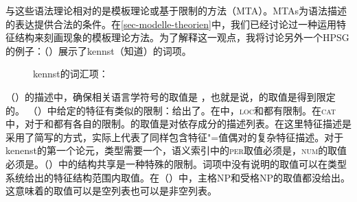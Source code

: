 与这些语法理论相对的是模板理论或基于限制的方法（MTA）。MTAs为语法描述的表达提供合法的条件。在\ref{sec-modelle-theorien}中，我们已经讨论过一种运用特征结构来刻画现象的模板理论方法。为了解释这一观点，我将讨论另外一个HPSG的例子：（）展示了kennst（知道）的词项。
\begin{figure}
\eas
kennst的词汇项：\\
\label{le-kennst-mts}%
\zs
\vspace{-\baselineskip}
\end{figure}
（）的描述中，确保相关语言学符号的\phonvc 取值是 ，也就是说，\phonc 的取值是得到限定的。 （）中给定的特征有类似的限制：给出了\synsemvc。在\synsemc 中，\textsc{loc}和\nonlocvc 都有限制。在\textsc{cat}中，对于\headc 和\subcatc 都有各自的限制。\subcatc 的取值是对依存成分的描述列表。在这里特征描述是采用了简写的方式，实际上代表了同样包含特征"=值偶对的复杂特征描述。对于kenenst的第一个论元，类型需要一个\headvc，语义索引中的\textsc{per}取值必须是，\textsc{num}的取值必须是。（）中的结构共享是一种特殊的限制。词项中没有说明的取值可以在类型系统给出的特征结构范围内取值。在（）中，主格NP和受格NP的\slashvc 取值都没给出。这意味着\slaschc 的取值可以是空列表也可以是非空列表。

